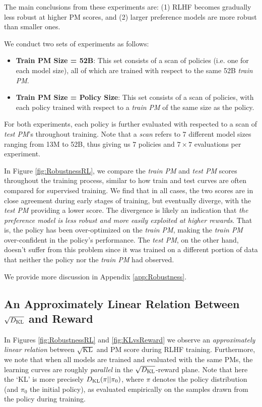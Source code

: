The main conclusions from these experiments are: (1) RLHF becomes gradually less robust at higher PM scores, and (2) larger preference models are more robust than smaller ones.

We conduct two sets of experiments as follows:

\begin{itemize}
    \item 
    {\bf Train PM Size = 52B}: This set consists of a scan of policies (i.e. one for each model size), all of which are trained with respect to the same 52B {\it train PM}. 
    \item
    {\bf Train PM Size = Policy Size}: This set consists of a scan of policies, with each policy trained with respect to a {\it train PM} of the same size as the policy. 
\end{itemize}

For both experiments, each policy is further evaluated with respected to a scan of {\it test PM}'s throughout training. Note that a {\it scan} refers to 7 different model sizes ranging from 13M to 52B, thus giving us 7 policies and $7\times 7$ evaluations per experiment.

In Figure \ref{fig:RobustnessRL}, we compare the {\it train PM} and {\it test PM} scores throughout the training process, similar to how train and test curves are often compared for supervised training. We find that in all cases, the two scores are in close agreement during early stages of training, but eventually diverge, with the {\it test PM} providing a lower score. The divergence is likely an indication that {\it the preference model is less robust and more easily exploited at higher rewards}. That is, the policy has been over-optimized on the {\it train PM}, making the {\it train PM} over-confident in the policy's performance. The {\it test PM}, on the other hand, doesn't suffer from this problem since it was trained on a  different portion of data that neither the policy nor the {\it train PM} had observed.

We provide more discussion in Appendix \ref{app:Robustness}.

\subsection{An Approximately Linear Relation Between $\sqrt{D_{\rm KL}}$ and Reward}
\label{sec:KL}
In Figures \ref{fig:RobustnessRL} and \ref{fig:KLvsReward} we observe an \emph{approximately linear relation} between $\sqrt{\mathrm{KL}}$ and PM score during RLHF training.  Furthermore, we note that when all models are trained and evaluated with the same PMs, the learning curves are roughly \emph{parallel} in the $\sqrt{D_{\rm KL}}$-reward plane. Note that here the `KL' is more precisely $D_{\rm KL}(\pi || \pi_0)$, where $\pi$ denotes the policy distribution (and $\pi_0$ the initial policy), as evaluated empirically on the samples drawn from the policy during training.  

